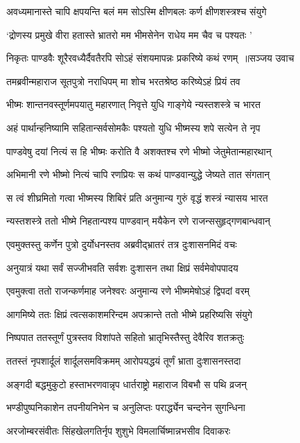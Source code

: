 \twolineshloka
{अवध्यमानास्ते चापि क्षपयन्ति बलं मम}
{सोऽस्मि क्षीणबलः कर्ण क्षीणशस्त्रश्च संयुगे}


\twolineshloka
{`द्रोणस्य प्रमुखे वीरा हतास्ते भ्रातरो मम}
{भीमसेनेन राधेय मम चैव च पश्यतः '}


\threelineshloka
{निकृतः पाण्डवैः शूरैरवध्यैर्दैवतैरपि}
{सोऽहं संशयमापन्नः प्रकरिष्ये कथं रणम् ॥सञ्जय उवाच}
{}


\twolineshloka
{तमब्रवीन्महाराज सूतपुत्रो नराधिपम्}
{मा शोच भरतश्रेष्ठ करिष्येऽहं प्रियं तव}


\twolineshloka
{भीष्मः शान्तनवस्तूर्णमपयातु महारणात्}
{निवृत्ते युधि गाङ्गेये न्यस्तशस्त्रे च भारत}


\twolineshloka
{अहं पार्थान्हनिष्यामि सहितान्सर्वसोमकैः}
{पश्यतो युधि भीष्मस्य शपे सत्येन ते नृप}


\twolineshloka
{पाण्डवेषु दयां नित्यं स हि भीष्मः करोति वै}
{अशक्तश्च रणे भीष्मो जेतुमेतान्महारथान्}


\twolineshloka
{अभिमानी रणे भीष्मो नित्यं चापि रणप्रियः}
{स कथं पाण्डवान्युद्धे जेष्यते तात संगतान्}


\twolineshloka
{स त्वं शीघ्रमितो गत्वा भीष्मस्य शिबिरं प्रति}
{अनुमान्य गुरुं वृद्धं शस्त्रं न्यासय भारत}


\twolineshloka
{न्यस्तशस्त्रे ततो भीष्मे निहतान्पश्य पाण्डवान्}
{मयैकेन रणे राजन्ससुहृद्गणबान्धवान्}


\twolineshloka
{एवमुक्तस्तु कर्णेन पुत्रो दुर्योधनस्तव}
{अब्रवीद्भ्रातरं तत्र दुःशासनमिदं वचः}


\twolineshloka
{अनुयात्रं यथा सर्वं सज्जीभवति सर्वशः}
{दुःशासन तथा क्षिप्रं सर्वमेवोपपादय}


\twolineshloka
{एवमुक्त्वा ततो राजन्कर्णमाह जनेश्वरः}
{अनुमान्य रणे भीष्ममेषोऽहं द्विपदां वरम्}


\twolineshloka
{आगमिष्ये ततः क्षिप्रं त्वत्सकाशमरिन्दम}
{अपक्रान्ते ततो भीष्मे प्रहरिष्यसि संयुगे}


\twolineshloka
{निष्पपात ततस्तूर्णं पुत्रस्तव विशांपते}
{सहितो भ्रातृभिस्तैस्तु देवैरिव शतक्रतुः}


\twolineshloka
{ततस्तं नृपशार्दूलं शार्दूलसमविक्रमम्}
{आरोपयद्धयं तूर्णं भ्राता दुःशासनस्तदा}


\twolineshloka
{अङ्गदी बद्धमुकुटो हस्ताभरणवान्नृप}
{धार्तराष्ट्रो महाराज विबभौ स पथि व्रजन्}


\twolineshloka
{भण्डीपुष्पनिकाशेन तपनीयनिभेन च}
{अनुलिप्तः परार्द्ध्येन चन्दनेन सुगन्धिना}


\twolineshloka
{अरजोम्बरसंवीतः सिंहखेलगतिर्नृप}
{शुशुभे विमलार्चिष्मान्नभसीव दिवाकरः}


